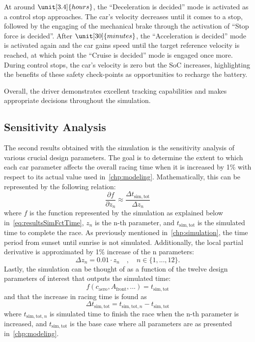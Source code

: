At around $\unit[3.4]{hours}$, the \enquote{Deceleration is decided} mode is activated as a control stop approaches. The car's velocity decreases until it comes to a stop, followed by the engaging of the mechanical brake through the activation of \enquote{Stop force is decided}. After $\unit[30]{minutes}$, the \enquote{Acceleration is decided} mode is activated again and the car gains speed until the target reference velocity is reached, at which point the \enquote{Cruise is decided} mode is engaged once more. During control stops, the car's velocity is zero but the SoC increases, highlighting the benefits of these safety check-points as opportunities to recharge the battery.

Overall, the driver demonstrates excellent tracking capabilities and makes appropriate decisions throughout the simulation.


\subsection{Sensitivity Analysis}
\label{sec:resultsSensitivityAnalysis}
The second results obtained with the simulation is the sensitivity analysis of various crucial design parameters. The goal is to determine the extent to which each car parameter affects the overall racing time when it is increased by 1\% with respect to its actual value used in~\cref{chp:modeling}. Mathematically, this can be represented by the following relation:
\begin{equation}
	\frac{\partial f}{\partial z_n} \approx \frac{\Delta t_\mathrm{sim,tot}}{\Delta z_n}
\end{equation}
where $f$ is the function represented by the simulation as explained below in~\cref{eq:resultsSimFctTime}, $z_n$ is the n-th parameter, and $t_\mathrm{sim,tot}$ is the simulated time to complete the race. As previously mentioned in~\cref{chp:simulation}, the time period from sunset until sunrise is not simulated. Additionally, the local partial derivative is approximated by 1\% increase of the n parameters:
\begin{equation}
	\Delta z_n = 0.01 \cdot z_n \quad , \quad n \in \{1,...,12\}.
\end{equation}
Lastly, the simulation can be thought of as a function of the twelve design parameters of interest that outputs the simulated time:
\begin{equation}
	f(c_\mathrm{aero}, A_\mathrm{front}, ...) = t_\mathrm{sim,tot} \label{eq:resultsSimFctTime}
\end{equation}
and that the increase in racing time is found as
\begin{equation}
	\Delta t_\mathrm{sim,tot} = t_{\mathrm{sim,tot,}n} - t_\mathrm{sim,tot}
\end{equation}
where $t_{\mathrm{sim,tot,}n}$ is simulated time to finish the race when the n-th parameter is increased, and $t_\mathrm{sim,tot}$ is the base case where all parameters are as presented in~\cref{chp:modeling}.

